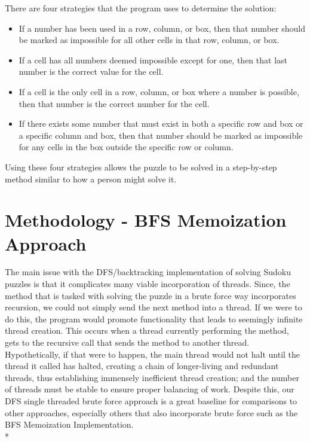 \documentclass[conference]{IEEEtran}
\begin{document}
There are four strategies that the program uses to determine the solution:
\vspace{1\baselineskip}
\begin{itemize}
    \item{If a number has been used in a row, column, or box, 
    then that number should be marked as impossible for all other cells in that row, column, or box.}

    \item{If a cell has all numbers deemed impossible except for one, 
    then that last number is the correct value for the cell.}

    \item{If a cell is the only cell in a row, column, or box where a number is possible, 
    then that number is the correct number for the cell.}

    \item{If there exists some number that must exist in both a specific row and box or a specific column and box, 
    then that number should be marked as impossible for any cells in the box outside the specific row or column.}
\end{itemize}
Using these four strategies allows the puzzle to be solved in a step-by-step method similar to how a person might solve it.

\section{Methodology - BFS Memoization Approach}
The main issue with the DFS/backtracking implementation of solving Sudoku puzzles is that it complicates many viable incorporation of threads. Since, the method that is tasked with solving the puzzle in a brute force way incorporates recursion, we could not simply send the next method into a thread. If we were to do this, the program would promote functionality that leads to seemingly infinite thread creation. This occurs when a thread currently performing the method, gets to the recursive call that sends the method to another thread. Hypothetically, if that were to happen, the main thread would not halt until the thread it called has halted, creating a chain of longer-living and redundant threads, thus establishing immensely inefficient thread creation; and the number of threads must be stable to ensure proper balancing of work. Despite this, our DFS single threaded brute force approach is a great baseline for comparisons to other approaches, especially others that also incorporate brute force such as the BFS Memoization Implementation.
\\*
\end{document}
